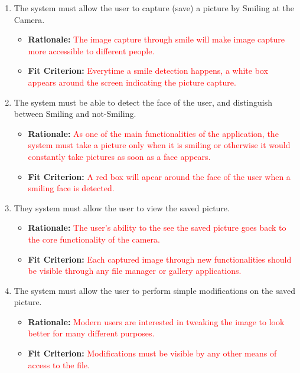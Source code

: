 \documentclass[12pt, titlepage]{article}
\begin{document}
{\color{red}
\begin{enumerate}[{REQ}1.]
\item The system must allow the user to capture (save) a picture by Smiling at the Camera.
	\begin{itemize}
		\item \textbf{Rationale:} \textcolor{red}{The image capture through smile will make image capture more accessible to different people.}
		\item \textbf{Fit Criterion:}  \textcolor{red}{Everytime a smile detection happens, a white box appears around the screen indicating the picture capture.}
	\end{itemize}
\item The system must be able to detect the face of the user, and distinguish between Smiling and not-Smiling.
	\begin{itemize}
		\item \textbf{Rationale:}  \textcolor{red}{As one of the main functionalities of the application, the system must take a picture only when it is smiling or otherwise it would constantly take pictures as soon as a face appears.}
		\item \textbf{Fit Criterion:}  \textcolor{red}{A red box will apear around the face of the user when a smiling face is detected.}
	\end{itemize}
\item They system must allow the user to view the saved picture. 
	\begin{itemize}
		\item \textbf{Rationale:}   \textcolor{red}{The user's ability to the see the saved picture goes back to the core functionality of the camera.}
		\item \textbf{Fit Criterion:}   \textcolor{red}{Each captured image through new functionalities should be visible through any file manager or gallery applications. }
	\end{itemize}
\item The system must allow the user to perform simple modifications on the saved picture. 
	\begin{itemize}
		\item \textbf{Rationale:}  \textcolor{red}{Modern users are interested in tweaking the image to look better for many different purposes.}
		\item \textbf{Fit Criterion:}   \textcolor{red}{Modifications must be visible by any other means of access to the file.}
	\end{itemize}

\end{enumerate}}
\end{document}
